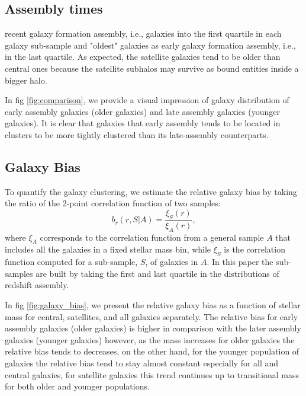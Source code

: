 \documentclass[a4paper,fleqn,usenatbib]{mnras}
\begin{document}
\subsection{Assembly times}
\label{sec:assembly_times}


recent galaxy formation assembly, i.e., galaxies into the first
quartile in each galaxy sub-sample and "oldest" galaxies as early
galaxy formation assembly, i.e., in the last quartile. As expected,
the satellite galaxies tend to be older than central ones because the
satellite subhalos may survive as bound entities inside a bigger halo.


In fig \ref{fig:comparison}, we provide a visual impression of galaxy
distribution of early assembly galaxies (older galaxies) and late
assembly galaxies (younger galaxies). It is clear that galaxies that
early assembly tends to be located in clusters to be more tightly
clustered than its late-assembly counterparts. 



\subsection{Galaxy Bias}
To quantify the galaxy clustering, we estimate the relative galaxy
bias by taking the ratio of the 2-point correlation function of two
samples: 
%
\begin{equation}
b_r(r, S|A)= \frac{\xi_S(r)}{\xi_A(r)}, 
\label{eq:relative}
\end{equation}
%
where $\xi_A$ corresponds to the correlation function from a general
sample $A$ that includes all the galaxies in a fixed stellar mass bin,
while $\xi_S$ is the correlation function computed for a sub-sample,
$S$, of galaxies in $A$. In this paper the sub-samples are built by
taking the first and last quartile in the distributions of redshift
assembly. 

In fig \ref{fig:galaxy_bias}, we present the relative galaxy bias as a
function of stellar mass for central, satellites, and all galaxies
separately. The relative bias for early assembly galaxies (older
galaxies) is higher in comparison with the later assembly galaxies
(younger galaxies) however, as the mass increases for older galaxies
the relative bias tends to decreases, on the other hand, for the
younger population of galaxies the relative bias tend to stay almost
constant especially for all and central galaxies, for satellite
galaxies this trend continues up to transitional mass for both older
and younger populations. 
\end{document}
